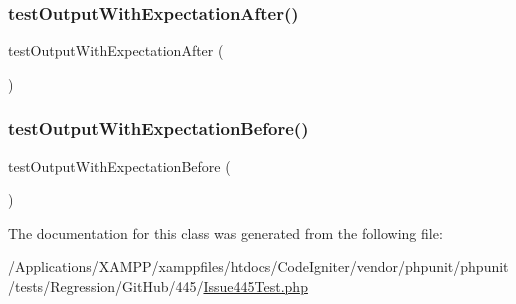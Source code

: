 \mbox{\label{class_issue445_test_acaa232f0410700a492c839aae855a504}} 
\subsubsection{\texorpdfstring{test\+Output\+With\+Expectation\+After()}{testOutputWithExpectationAfter()}}
{\footnotesize\ttfamily test\+Output\+With\+Expectation\+After (\begin{DoxyParamCaption}{ }\end{DoxyParamCaption})}

\mbox{\label{class_issue445_test_adf7c386bf9eafdf68da61e980d940938}} 
\subsubsection{\texorpdfstring{test\+Output\+With\+Expectation\+Before()}{testOutputWithExpectationBefore()}}
{\footnotesize\ttfamily test\+Output\+With\+Expectation\+Before (\begin{DoxyParamCaption}{ }\end{DoxyParamCaption})}



The documentation for this class was generated from the following file\+:\begin{DoxyCompactItemize}
\item 
/\+Applications/\+X\+A\+M\+P\+P/xamppfiles/htdocs/\+Code\+Igniter/vendor/phpunit/phpunit/tests/\+Regression/\+Git\+Hub/445/\mbox{\hyperlink{_issue445_test_8php}{Issue445\+Test.\+php}}\end{DoxyCompactItemize}
